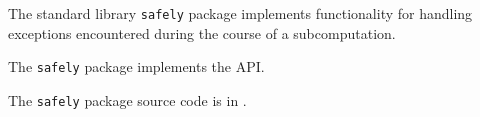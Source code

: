 
The standard library {\tt safely} package implements functionality for handling 
exceptions encountered during the course of a subcomputation.

The {\tt safely} package implements the  API.

The {\tt safely} package source code is in .



